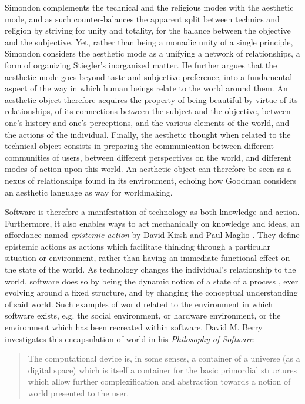 
Simondon complements the technical and the religious modes with the aesthetic mode, and as such counter-balances the apparent split between technics and religion by striving for unity and totality, for the balance between the objective and the subjective. Yet, rather than being a monadic unity of a single principle, Simondon considers the aesthetic mode as a unifying a network of relationships, a form of organizing Stiegler's inorganized matter. He further argues that the aesthetic mode goes beyond taste and subjective preference, into a fundamental aspect of the way in which human beings relate to the world around them. An aesthetic object therefore acquires the property of being beautiful by virtue of its relationships, of its connections between the subject and the objective, between one's history and one's perceptions, and the various elements of the world, and the actions of the individual. Finally, the aesthetic thought when related to the technical object consists in preparing the communication between different communities of users, between different perspectives on the world, and different modes of action upon this world. An aesthetic object can therefore be seen as a nexus of relationships found in its environment, echoing how Goodman considers an aesthetic language as way for worldmaking.

Software is therefore a manifestation of technology as both knowledge and action. Furthermore, it also enables ways to act mechanically on knowledge and ideas, an affordance named \emph{epistemic action} by David Kirsh and Paul Maglio \citep{kirsh_distinguishing_1994}. They define epistemic actions as actions which facilitate thinking through a particular situation or environment, rather than having an immediate functional effect on the state of the world. As technology changes the individual's relationship to the world, software does so by being the dynamic notion of a state of a process \citep{rapaport_philosophy_2005}, ever evolving around a fixed structure, and by changing the conceptual understanding of said world. Such examples of world related to the environment in which software exists, e.g. the social environment, or hardware environment, or the environment which has been recreated within software. David M. Berry investigates this encapsulation of world in his \emph{Philosophy of Software}:

\begin{quote}
    The computational device is, in some senses, a container of a universe (as a digital space) which is itself a container for the basic primordial structures which allow further complexification and abstraction towards a notion of world presented to the user. \citep{berry_philosophy_2011}
\end{quote}

